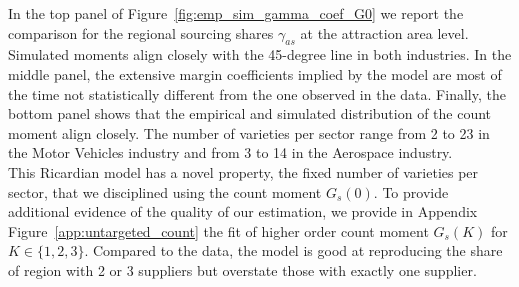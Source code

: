 In the top panel of Figure~\ref{fig:emp_sim_gamma_coef_G0} we report the comparison for the regional sourcing shares $\gamma_{as}$ at the attraction area level. Simulated moments align closely with the 45-degree line in both industries. In the middle panel, the extensive margin coefficients implied by the model are most of the time not statistically different from the one observed in the data. Finally, the bottom panel shows that the empirical and simulated distribution of the count moment align closely. The number of varieties per sector range from 2 to 23 in the Motor Vehicles industry and from 3 to 14 in the Aerospace industry. \\

This Ricardian model has a novel property, the fixed number of varieties per sector, that we disciplined using the count moment $G_s(0)$. To provide additional evidence of the quality of our estimation, we provide in Appendix Figure~\ref{app:untargeted_count} the fit of higher order count moment $G_s(K)$ for $K \in \{1,2,3\}$. Compared to the data, the model is good at reproducing the share of region with 2 or 3 suppliers but overstate those with exactly one supplier. \\
